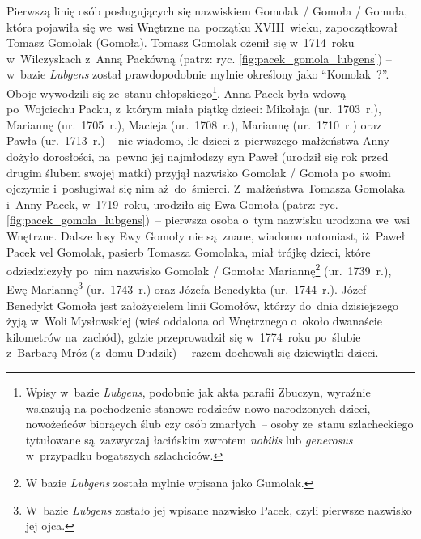 Pierwszą linię osób posługujących się nazwiskiem Gomolak / Gomoła / Gomuła, 
która pojawiła się we~wsi Wnętrzne na~początku XVIII~wieku, zapoczątkował
Tomasz Gomolak (Gomoła). Tomasz
Gomolak ożenił się w~1714~roku w~Wilczyskach z~Anną
Packówną (patrz: ryc.
\ref{fig:pacek_gomola_lubgens}) -- w~bazie \emph{Lubgens} został
prawdopodobnie mylnie określony jako \enquote{Komolak~?}. Oboje wywodzili się
ze~stanu chłopskiego\footnote{Wpisy w~bazie \emph{Lubgens}, podobnie jak akta
parafii Zbuczyn, wyraźnie wskazują na pochodzenie stanowe rodziców
nowo narodzonych dzieci, nowożeńców biorących ślub czy osób zmarłych~--
osoby ze~stanu szlacheckiego tytułowane są~zazwyczaj łacińskim zwrotem
\emph{nobilis} lub \emph{generosus} w~przypadku bogatszych szlachciców.}. Anna
Pacek była wdową po~Wojciechu Packu,
z~którym miała piątkę dzieci:
Mikołaja (ur.~1703~r.),
Mariannę  (ur.~1705~r.),
Macieja  (ur.~1708~r.),
Mariannę (ur.~1710~r.) oraz
Pawła (ur.~1713~r.) -- nie wiadomo,
ile dzieci z~pierwszego małżeństwa Anny dożyło dorosłości, na~pewno jej
najmłodszy syn Paweł (urodził się rok przed drugim ślubem swojej matki)
przyjął nazwisko Gomolak / Gomoła po~swoim ojczymie i~posługiwał się nim
aż~do~śmierci. Z~małżeństwa Tomasza Gomolaka i~Anny Pacek, w~1719~roku,
urodziła się Ewa Gomoła (patrz: ryc.
\ref{fig:pacek_gomola_lubgens})~-- pierwsza osoba o~tym nazwisku urodzona
we~wsi Wnętrzne. Dalsze losy Ewy Gomoły nie są~znane, wiadomo natomiast,
iż~Paweł Pacek vel Gomolak, pasierb Tomasza Gomolaka, miał trójkę dzieci,
które odziedziczyły po~nim nazwisko Gomolak / Gomoła:
Mariannę\footnote{W bazie
\emph{Lubgens} została mylnie wpisana jako Gumolak.} (ur.~1739~r.), Ewę
Mariannę\footnote{W~bazie
\emph{Lubgens} zostało jej wpisane nazwisko Pacek, czyli pierwsze nazwisko jej
ojca.} (ur.~1743~r.) oraz Józefa
Benedykta (ur.~1744~r.).
Józef Benedykt Gomoła jest założycielem  linii Gomołów, którzy do~dnia
dzisiejszego żyją w~Woli Mysłowskiej (wieś oddalona od Wnętrznego
o~około dwanaście kilometrów na~zachód), gdzie przeprowadził się w~1774~roku
po~ślubie z~Barbarą Mróz (z~domu Dudzik)~-- razem dochowali się dziewiątki dzieci.


